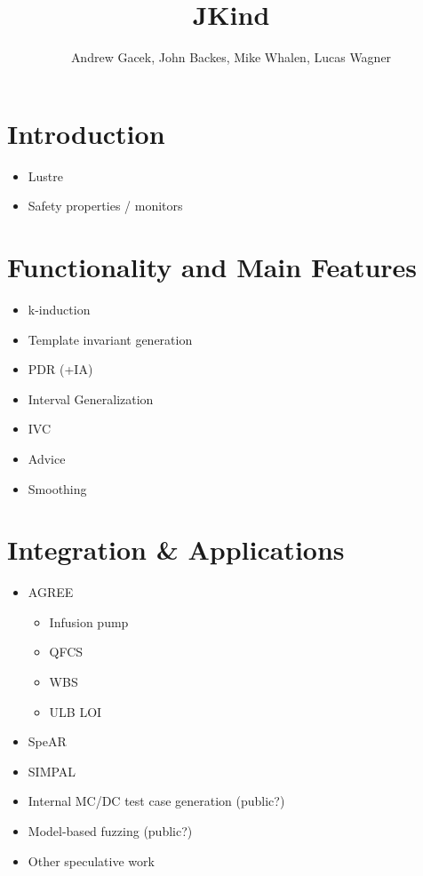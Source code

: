\documentclass{article}
\title{JKind}
\author{Andrew Gacek, John Backes, Mike Whalen, Lucas Wagner}
\begin{document}
\maketitle

\section{Introduction}

\begin{itemize}
\item Lustre
\item Safety properties / monitors
\end{itemize}

\section{Functionality and Main Features}

\begin{itemize}
\item k-induction
\item Template invariant generation
\item PDR (+IA)
\item Interval Generalization
\item IVC
\item Advice
\item Smoothing
\end{itemize}

\section{Integration \& Applications}

\begin{itemize}
\item AGREE
  \begin{itemize}
  \item Infusion pump
  \item QFCS
  \item WBS
  \item ULB LOI
  \end{itemize}
\item SpeAR~\cite{fifarek2017nfm}
\item SIMPAL~\cite{wagner2017spin}
\item Internal MC/DC test case generation (public?)
\item Model-based fuzzing (public?)
\item Other speculative work
\end{itemize}
\end{document}
